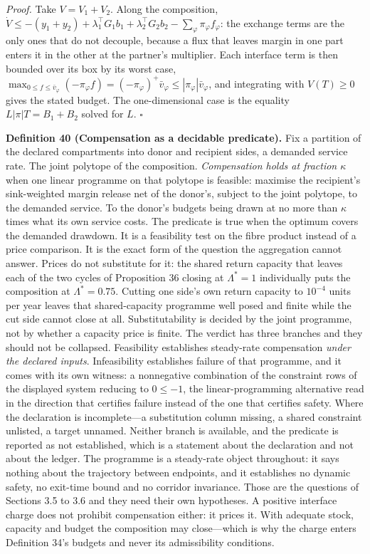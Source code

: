 \documentclass[11pt]{article}
\begin{document}
\emph{Proof.} Take \(V = V_1 + V_2\). Along the composition, \(\dot V \le -(y_1 + y_2) + \lambda_1^{\top} G_1 b_1 + \lambda_2^{\top} G_2 b_2 - \sum_\varphi \pi_\varphi f_\varphi\): the exchange terms are the only ones that do not
decouple, because a flux that leaves margin in one part enters it in the other at the partner's
multiplier. Each interface term is then bounded over its box by its worst case,
\(\max_{0 \le f \le \bar v_\varphi}(-\pi_\varphi f) = (-\pi_\varphi)^{+}\bar v_\varphi \le |\pi_\varphi|\bar v_\varphi\), and integrating with \(V(T) \ge 0\) gives the stated budget. The
one-dimensional case is the equality \(L|\pi|T = B_1 + B_2\) solved for \(L\). \ensuremath{\square}

\textbf{Definition 40 (Compensation as a decidable predicate).} Fix a partition of the declared compartments into donor and recipient sides, a demanded service rate. The joint polytope of the composition. \emph{Compensation holds at fraction \(\kappa\)} when one linear programme on that polytope is feasible: maximise the recipient's sink-weighted margin release net of the donor's, subject to the joint polytope, to the demanded service. To the donor's budgets being drawn at no more than \(\kappa\) times what its own service costs. The predicate is true when the optimum covers the demanded drawdown. It is a feasibility test on the fibre product instead of a price comparison. It is the exact form of the question the aggregation cannot answer. Prices do not substitute for it: the shared return capacity that leaves each of the two cycles of Proposition 36 closing at \(\Lambda^{*} = 1\) individually puts the composition at \(\Lambda^{*} = 0.75\). Cutting one side's own return capacity to \(10^{-4}\) units per year leaves that shared-capacity programme well posed and finite while the cut side cannot close at all. Substitutability is decided by the joint programme, not by whether a capacity price is finite. The verdict has three branches and they should not be collapsed. Feasibility establishes steady-rate compensation \emph{under the declared inputs}. Infeasibility establishes failure of that programme, and it comes with its own witness: a nonnegative combination of the constraint rows of the displayed system reducing to \(0 \le -1\), the linear-programming alternative read in the direction that certifies failure instead of the one that certifies safety. Where the declaration is incomplete---a substitution column missing, a shared constraint unlisted, a target unnamed. Neither branch is available, and the predicate is reported as not established, which is a statement about the declaration and not about the ledger. The programme is a steady-rate object throughout: it says nothing about the trajectory between endpoints, and it establishes no dynamic safety, no exit-time bound and no corridor invariance. Those are the questions of Sections 3.5 to 3.6 and they need their own hypotheses. A positive interface charge does not prohibit compensation either: it prices it. With adequate stock, capacity and budget the composition may close---which is why the charge enters Definition 34's budgets and never its admissibility conditions.
\end{document}
